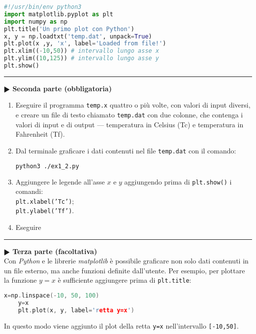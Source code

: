 \documentclass[11pt]{article}
\begin{document}
\newpage
\begin{lstlisting}[caption={Programma {\it python} \texttt{ex1\_2.py}},language=Python]
#!/usr/bin/env python3
import matplotlib.pyplot as plt
import numpy as np
plt.title('Un primo plot con Python')
x, y = np.loadtxt('temp.dat', unpack=True)
plt.plot(x ,y, 'x', label='Loaded from file!')
plt.xlim((-10,50)) # intervallo lungo asse x
plt.ylim((10,125)) # intervallo lungo asse y
plt.show()
\end{lstlisting}
\vspace{2mm}
\hrule
\vspace{2mm}
\textbf{$\RHD$ Seconda parte (obbligatoria)} 
%
\begin{enumerate}
\item Eseguire il programma \texttt{temp.x} quattro o pi\`u volte, con valori di input diversi, e creare un file di testo chiamato \texttt{temp.dat} con due colonne,
  che contenga i valori di input e di output --- temperatura in Celsius (Tc) e
  temperatura in Fahrenheit (Tf).
\item Dal terminale graficare i dati contenuti nel file \texttt{temp.dat} con il comando:\\
  \begin{lstlisting}[language=bash,numbers=none]
python3 ./ex1_2.py
\end{lstlisting}
\item Aggiungere le legende all'asse $x$ e $y$ aggiungendo prima di \texttt{plt.show()} i comandi:
\\
\texttt{plt.xlabel('Tc')};
\\
\texttt{plt.ylabel('Tf')}.
 \item Eseguire 
 \end{enumerate}


\hrule
\vspace{2mm}\textbf{$\RHD$ Terza parte (facoltativa)\\}
%
Con {\it Python\/} e le librerie {\it matplotlib\/} \`e possibile graficare non solo dati contenuti in un file esterno, ma anche funzioni definite dall'utente. Per esempio, 
per plottare la funzione $y=x$ \`e sufficiente aggiungere prima di \texttt{plt.title}: 
\begin{lstlisting}[language=c]
    x=np.linspace(-10, 50, 100)
    y=x
    plt.plot(x, y, label='retta y=x')
\end{lstlisting}
In questo modo viene aggiunto il plot della retta \texttt{y=x} nell'intervallo \texttt{[-10,50]}. 
\end{document}
